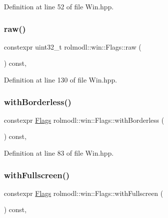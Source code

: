 Definition at line 52 of file Win.\+hpp.

\mbox{\label{structrolmodl_1_1win_1_1_flags_a6e3024e05b08cb7c2659e43e730431ac}} 
\subsubsection{\texorpdfstring{raw()}{raw()}}
{\footnotesize\ttfamily constexpr uint32\+\_\+t rolmodl\+::win\+::\+Flags\+::raw (\begin{DoxyParamCaption}{ }\end{DoxyParamCaption}) const\hspace{0.3cm}{\ttfamily [inline]}, {\ttfamily [noexcept]}}



Definition at line 130 of file Win.\+hpp.

\mbox{\label{structrolmodl_1_1win_1_1_flags_a5c4f00d4a5719a7ea9cb598da639c1c2}} 
\subsubsection{\texorpdfstring{withBorderless()}{withBorderless()}}
{\footnotesize\ttfamily constexpr \mbox{\hyperlink{structrolmodl_1_1win_1_1_flags}{Flags}} rolmodl\+::win\+::\+Flags\+::with\+Borderless (\begin{DoxyParamCaption}{ }\end{DoxyParamCaption}) const\hspace{0.3cm}{\ttfamily [inline]}, {\ttfamily [noexcept]}}



Definition at line 83 of file Win.\+hpp.

\mbox{\label{structrolmodl_1_1win_1_1_flags_a6a613cbcc860f9019217481868e499a8}} 
\subsubsection{\texorpdfstring{withFullscreen()}{withFullscreen()}}
{\footnotesize\ttfamily constexpr \mbox{\hyperlink{structrolmodl_1_1win_1_1_flags}{Flags}} rolmodl\+::win\+::\+Flags\+::with\+Fullscreen (\begin{DoxyParamCaption}{ }\end{DoxyParamCaption}) const\hspace{0.3cm}{\ttfamily [inline]}, {\ttfamily [noexcept]}}




